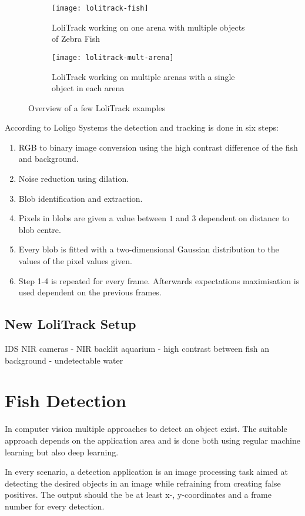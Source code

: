 \begin{figure}[H]
	\centering
	\begin{subfigure}{0.45\textwidth}
		\texttt{[image: lolitrack-fish]}
		\caption{LoliTrack working on one arena with multiple objects of Zebra Fish}
	\end{subfigure}
	\begin{subfigure}{0.45\textwidth}
		\texttt{[image: lolitrack-mult-arena]}
		\caption{LoliTrack working on multiple arenas with a single object in each arena}
	\end{subfigure}
	\caption{Overview of a few LoliTrack examples}
	\label{fig:lolitrack_examples}
\end{figure}

According to Loligo Systems the detection and tracking is done in six steps:

\begin{enumerate}
	\item RGB to binary image conversion using the high contrast difference of the fish and background.
	\item Noise reduction using dilation.
	\item Blob identification and extraction.
	\item Pixels in blobs are given a value between $1$ and $3$ dependent on distance to blob centre.
	\item Every blob is fitted with a two-dimensional Gaussian distribution to the values of the pixel values given.
	\item Step 1-4 is repeated for every frame. Afterwards expectations maximisation is used dependent on the previous frames.
\end{enumerate}

\subsection{New LoliTrack Setup}
IDS NIR cameras - NIR backlit aquarium - high contrast between fish an background - undetectable water

\section{Fish Detection}
In computer vision multiple approaches to detect an object exist. The suitable approach depends on the application area and is done both using regular machine learning but also deep learning.

In every scenario, a detection application is an image processing task aimed at detecting the desired objects in an image while refraining from creating false positives. The output should the be at least x-, y-coordinates and a frame number for every detection.

